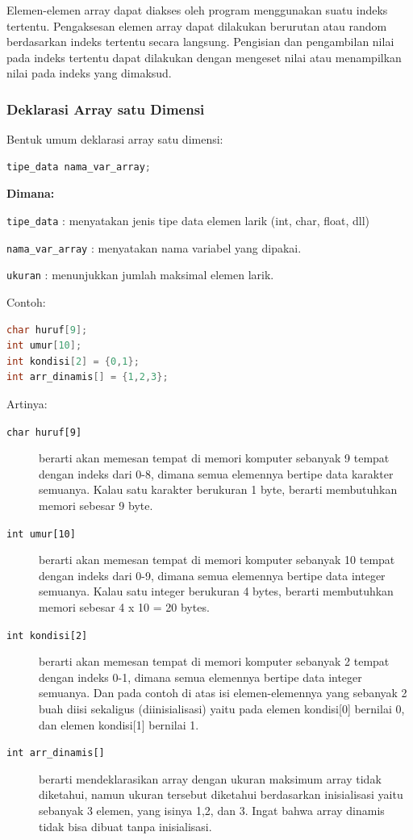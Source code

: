 Elemen-elemen array dapat diakses oleh program menggunakan suatu indeks
tertentu. Pengaksesan elemen array dapat dilakukan berurutan atau random
berdasarkan indeks tertentu secara langsung. Pengisian dan pengambilan
nilai pada indeks tertentu dapat dilakukan dengan mengeset nilai atau
menampilkan nilai pada indeks yang dimaksud.

\subsubsection{Deklarasi Array satu Dimensi}\label{deklarasi-array-satu-dimensi}

Bentuk umum deklarasi array satu dimensi:

\begin{lstlisting}[language=c++, numbers=none]
tipe_data nama_var_array;
\end{lstlisting}

\textbf{Dimana:}

\texttt{tipe\_data} : menyatakan jenis tipe data elemen larik (int,
char, float, dll)

\texttt{nama\_var\_array} : menyatakan nama variabel yang dipakai.

\texttt{ukuran} : menunjukkan jumlah maksimal elemen larik.

Contoh:

\begin{lstlisting}[language=c++, numbers=none]
char huruf[9];
int umur[10];
int kondisi[2] = {0,1};
int arr_dinamis[] = {1,2,3};
\end{lstlisting}

Artinya:

\begin{description}
\item[\texttt{char\ huruf{[}9{]}}]
berarti akan memesan tempat di memori komputer sebanyak 9 tempat dengan
indeks dari 0-8, dimana semua elemennya bertipe data karakter semuanya.
Kalau satu karakter berukuran 1 byte, berarti membutuhkan memori sebesar
9 byte.

\item[\texttt{int\ umur{[}10{]}}]
berarti akan memesan tempat di memori komputer sebanyak 10 tempat dengan
indeks dari 0-9, dimana semua elemennya bertipe data integer semuanya.
Kalau satu integer berukuran 4 bytes, berarti membutuhkan memori sebesar
4 x 10 = 20 bytes.

\item[\texttt{int\ kondisi{[}2{]}}]
berarti akan memesan tempat di memori komputer sebanyak 2 tempat dengan
indeks 0-1, dimana semua elemennya bertipe data integer semuanya. Dan
pada contoh di atas isi elemen-elemennya yang sebanyak 2 buah diisi
sekaligus (diinisialisasi) yaitu pada elemen kondisi{[}0{]} bernilai 0,
dan elemen kondisi{[}1{]} bernilai 1.

\item[\texttt{int\ arr\_dinamis{[}{]}}]
berarti mendeklarasikan array dengan ukuran maksimum array tidak
diketahui, namun ukuran tersebut diketahui berdasarkan inisialisasi
yaitu sebanyak 3 elemen, yang isinya 1,2, dan 3. Ingat bahwa array
dinamis tidak bisa dibuat tanpa inisialisasi.
\end{description}

